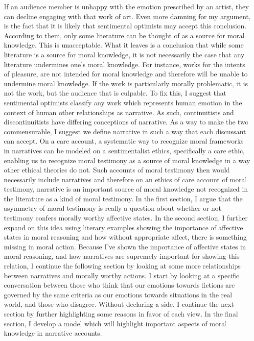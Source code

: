 \documentclass[
  12pt,
]{book}
\theoremstyle{definition}
\theoremstyle{definition}
\theoremstyle{definition}
\theoremstyle{definition}
\theoremstyle{remark}
\begin{document}
If an audience member is unhappy with the emotion prescribed by an artist, they can decline engaging with that work of art. Even more damning for my argument, is the fact that it is likely that sentimental optimists may accept this conclusion. According to them, only some literature can be thought of as a source for moral knowledge. This is unacceptable. What it leaves is a conclusion that while some literature is a source for moral knowledge, it is not necessarily the case that any literature undermines one's moral knowledge. For instance, works for the intents of pleasure, are not intended for moral knowledge and therefore will be unable to undermine moral knowledge. If the work is particularly morally problematic, it is not the work, but the audience that is culpable. To fix this, I suggest that sentimental optimists classify any work which represents human emotion in the context of human other relationships as narrative. As such, continuitists and discontinuitists have differing conceptions of narrative. As a way to make the two commensurable, I suggest we define narrative in such a way that each discussant can accept. On a care account, a systematic way to recognize moral frameworks in narratives can be modeled on a sentimentalist ethics, specifically a care ethic, enabling us to recognize moral testimony as a source of moral knowledge in a way other ethical theories do not. Such accounts of moral testimony then would necessarily include narratives and therefore on an ethics of care account of moral testimony, narrative is an important source of moral knowledge not recognized in the literature as a kind of moral testimony. In the first section, I argue that the asymmetry of moral testimony is really a question about whether or not testimony confers morally worthy affective states. In the second section, I further expand on this idea using literary examples showing the importance of affective states in moral reasoning and how without appropriate affect, there is something missing in moral action. Because I've shown the importance of affective states in moral reasoning, and how narratives are supremely important for showing this relation, I continue the following section by looking at some more relationships between narratives and morally worthy actions. I start by looking at a specific conversation between those who think that our emotions towards fictions are governed by the same criteria as our emotions towards situations in the real world, and those who disagree. Without declaring a side, I continue the next section by further highlighting some reasons in favor of each view. In the final section, I develop a model which will highlight important aspects of moral knowledge in narrative accounts.
\end{document}

